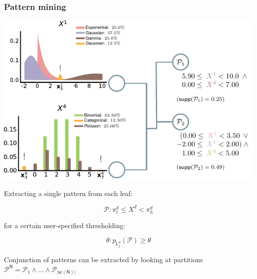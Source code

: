 \documentclass[xcolor={usenames,dvipsnames,svgnames}, compress, aspectratio=169, 11pt]{beamer}
\newcommand{\Node}{\mathsf{N}}
\newcommand{\Leaf}{\mathsf{L}}
\newcommand{\scope}{\mathsf{sc}}
\begin{document}
\begin{frame}[t, htt=bgrey2]
  \frametitle{Pattern mining}

  \large
  \begin{minipage}[t]{0.66\linewidth}
    \includegraphics[width=.99\linewidth]{figures/abda-pattern-mining}
  \end{minipage}\hfill\begin{minipage}[t]{0.3\linewidth}
    \vspace{-150pt}

    Extracting a single pattern from each leaf:

    $$\mathcal{P}\colon \pi_{l}^{d}\leq X^{d}<\pi_{h}^{d}$$

    for a certain user-specified thresholding:

    $$\theta: p_{\Leaf^d_{j}}(\mathcal{P}) \geq \theta$$

    Conjunction of patterns can be extracted by looking at partitions
    $\mathcal{P}^{\Node}=\mathcal{P}_{1}\wedge\ldots\wedge\mathcal{P}_{|\scope(\Node)|}$

     
    
  \end{minipage}  
\end{frame}
\end{document}
